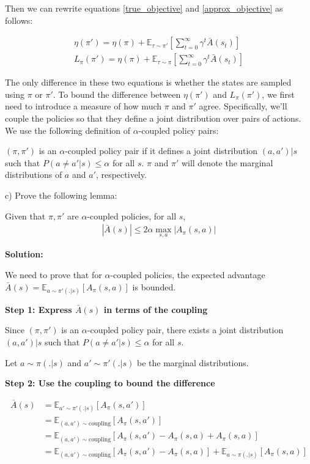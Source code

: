 Then we can rewrite equations \ref{true_objective} and \ref{approx_objective} as follows:

\begin{align}
    \eta(\pi') = \eta(\pi) + \mathbb{E}_{\tau \sim \pi'}[\sum_{t = 0}^{\infty}\gamma^t \bar{A}(s_t)] \\
    L_{\pi}(\pi') = \eta(\pi) + \mathbb{E}_{\tau \sim \pi}[\sum_{t = 0}^{\infty}\gamma^t \bar{A}(s_t)] 
\end{align}

The only difference in these two equations is whether the states are sampled using $\pi$ or $\pi'$. To bound the difference between $\eta(\pi')$ and $L_{\pi}(\pi')$, we first need to introduce a measure of how much $\pi$ and $\pi'$ agree. Specifically, we'll couple the policies so that they define a joint distribution over pairs of actions. We use the following definition of $\alpha$-coupled policy pairs:

\begin{definition}
    $(\pi, \pi')$ is an $\alpha$-coupled policy pair if it defines a joint distribution $(a, a')|s$ such that $P(a \neq a'|s) \le \alpha$ for all $s$. $\pi$ and $\pi'$ will denote the marginal distributions of $a$ and $a'$, respectively.
\end{definition}

c) Prove the following lemma:

\begin{lemma}
    Given that $\pi, \pi'$ are $\alpha$-coupled policies, for all $s$,
    \begin{align*}
        |\bar{A}(s)| \le 2\alpha \max_{s, a}|A_{\pi}(s,a)|
    \end{align*}
\end{lemma}

\textbf{Solution:}

We need to prove that for $\alpha$-coupled policies, the expected advantage $\bar{A}(s) = \mathbb{E}_{a \sim \pi'(.|s)}[A_{\pi}(s, a)]$ is bounded.

\textbf{Step 1: Express $\bar{A}(s)$ in terms of the coupling}

Since $(\pi, \pi')$ is an $\alpha$-coupled policy pair, there exists a joint distribution $(a, a')|s$ such that $P(a \neq a'|s) \le \alpha$ for all $s$.

Let $a \sim \pi(.|s)$ and $a' \sim \pi'(.|s)$ be the marginal distributions.

\textbf{Step 2: Use the coupling to bound the difference}

\begin{align}
\bar{A}(s) &= \mathbb{E}_{a' \sim \pi'(.|s)}[A_{\pi}(s, a')] \\
&= \mathbb{E}_{(a,a') \sim \text{coupling}}[A_{\pi}(s, a')] \\
&= \mathbb{E}_{(a,a') \sim \text{coupling}}[A_{\pi}(s, a') - A_{\pi}(s, a) + A_{\pi}(s, a)] \\
&= \mathbb{E}_{(a,a') \sim \text{coupling}}[A_{\pi}(s, a') - A_{\pi}(s, a)] + \mathbb{E}_{a \sim \pi(.|s)}[A_{\pi}(s, a)]
\end{align}

